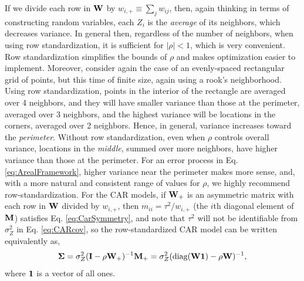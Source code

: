 \documentclass[11pt, titlepage]{article}\usepackage[]{graphicx}\usepackage[]{color}
\begin{document}
\begin{spacing}{1.9}
\begin{flushleft}
If we divide each row in $\mathbf{W}$ by $w_{i,+} \equiv \sum_j w_{ij}$, then, again thinking in terms of constructing random variables, each $Z_i$ is the \textit{average} of its neighbors, which decreases variance. In general then, regardless of the number of neighbors, when using row standardization, it is sufficient for $|\rho| < 1$, which is very convenient. Row standardization simplifies the bounds of $\rho$ and makes optimization easier to implement.  Moreover, consider again the case of an evenly-spaced rectangular grid of points, but this time of finite size, again using a rook's neighborhood.  Using row standardization, points in the interior of the rectangle are averaged over 4 neighbors, and they will have smaller variance than those at the perimeter, averaged over 3 neighbors, and the highest variance will be locations in the corners, averaged over 2 neighbors.  Hence, in general, variance increases toward the \textit{perimeter}.  Without row standardization, even when $\rho$ controls overall variance, locations in the \textit{middle}, summed over more neighbors, have higher variance than those at the perimeter.  For an error process in Eq. \ref{eq:ArealFramework}, higher variance near the perimeter makes more sense, and, with a more natural and consistent range of values for $\rho$, we highly recommend row-standardization. For the CAR models, if $\mathbf{W}_+$ is an asymmetric matrix with each row in $\mathbf{W}$ divided by $w_{i,+}$, then $m_{ii} = \tau^2/w_{i,+}$ (the $i$th diagonal element of $\mathbf{M}$) satisfies Eq. \ref{eq:CarSymmetry}, and note that $\tau^2$ will not be identifiable from $\sigma_Z^2$ in Eq. \ref{eq:CARcov}, so the row-standardized CAR model can be written equivalently as,
\begin{equation}\label{eq:bWone}
  \mbox{\boldmath $\Sigma$} = \sigma_Z^2(\mathbf{I} - \rho\mathbf{W}_+)^{-1}\mathbf{M}_+= \sigma_Z^2(\textrm{diag}(\mathbf{W}\mathbf{1}) - \rho\mathbf{W})^{-1},
\end{equation}
where $\mathbf{1}$ is a vector of all ones.


\end{flushleft}
\end{spacing}
\end{document}
